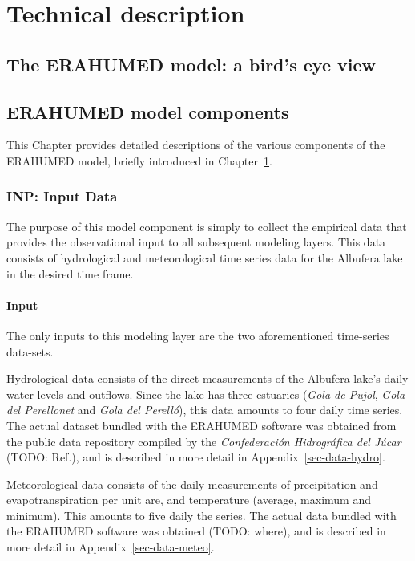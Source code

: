 \documentclass[
  letterpaper,
  DIV=11,
  numbers=noendperiod]{scrreprt}
\begin{document}
\part{Technical description}

\chapter{The ERAHUMED model: a bird's eye
view}\label{sec-birds-eye-view}

\chapter{ERAHUMED model components}\label{erahumed-model-components}

This Chapter provides detailed descriptions of the various components of
the ERAHUMED model, briefly introduced in
Chapter~\ref{sec-birds-eye-view}.

\section{INP: Input Data}\label{sec-inp}

The purpose of this model component is simply to collect the empirical
data that provides the observational input to all subsequent modeling
layers. This data consists of hydrological and meteorological time
series data for the Albufera lake in the desired time frame.

\subsection{Input}\label{input}

The only inputs to this modeling layer are the two aforementioned
time-series data-sets.

Hydrological data consists of the direct measurements of the Albufera
lake's daily water levels and outflows. Since the lake has three
estuaries (\emph{Gola de Pujol}, \emph{Gola del Perellonet} and
\emph{Gola del Perelló}), this data amounts to four daily time series.
The actual dataset bundled with the ERAHUMED software was obtained from
the public data repository compiled by the \emph{Confederación
Hidrográfica del Júcar} (TODO: Ref.), and is described in more detail in
Appendix~\ref{sec-data-hydro}.

Meteorological data consists of the daily measurements of precipitation
and evapotranspiration per unit are, and temperature (average, maximum
and minimum). This amounts to five daily the series. The actual data
bundled with the ERAHUMED software was obtained (TODO: where), and is
described in more detail in Appendix~\ref{sec-data-meteo}.
\end{document}
